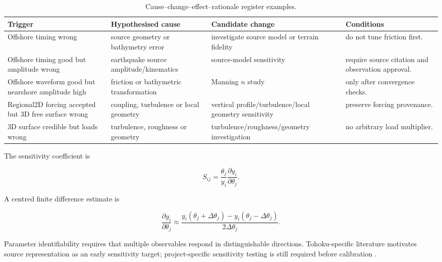 \begin{table}[H]
\centering
\caption{Cause--change--effect--rationale register examples.}
\label{tab:cause-change-register}
\begin{tabularx}{\textwidth}{p{}p{}p{}X}
\toprule
Trigger & Hypothesised cause & Candidate change & Conditions \\
\midrule
Offshore timing wrong & source geometry or bathymetry error & investigate source model or terrain fidelity & do not tune friction first. \\
Offshore timing good but amplitude wrong & earthquake source amplitude/kinematics & source-model sensitivity & require source citation and observation approval. \\
Offshore waveform good but nearshore amplitude high & friction or bathymetric transformation & Manning \(n\) study & only after convergence checks. \\
Regional2D forcing accepted but 3D free surface wrong & coupling, turbulence or local geometry & vertical profile/turbulence/local geometry sensitivity & preserve forcing provenance. \\
3D surface credible but loads wrong & turbulence, roughness or geometry & turbulence/roughness/geometry investigation & no arbitrary load multiplier. \\
\bottomrule
\end{tabularx}
\end{table}

The sensitivity coefficient is

\begin{equation}
\label{eq:sensitivity-coefficient}
S_{ij}
=
\frac{\theta_j}{y_i}
\frac{\partial y_i}{\partial\theta_j}.
\end{equation}

A centred finite difference estimate is

\begin{equation}
\label{eq:sensitivity-centred-difference}
\frac{\partial y_i}{\partial\theta_j}
\approx
\frac{
y_i(\theta_j+\Delta\theta_j)
-
y_i(\theta_j-\Delta\theta_j)
}{
2\Delta\theta_j
}.
\end{equation}

Parameter identifiability requires that multiple observables respond in distinguishable directions. Tohoku-specific literature motivates source representation as an early sensitivity target; project-specific sensitivity testing is still required before calibration \autocite{saito2014dispersion,baba2017farfield,wei2013japan}.

